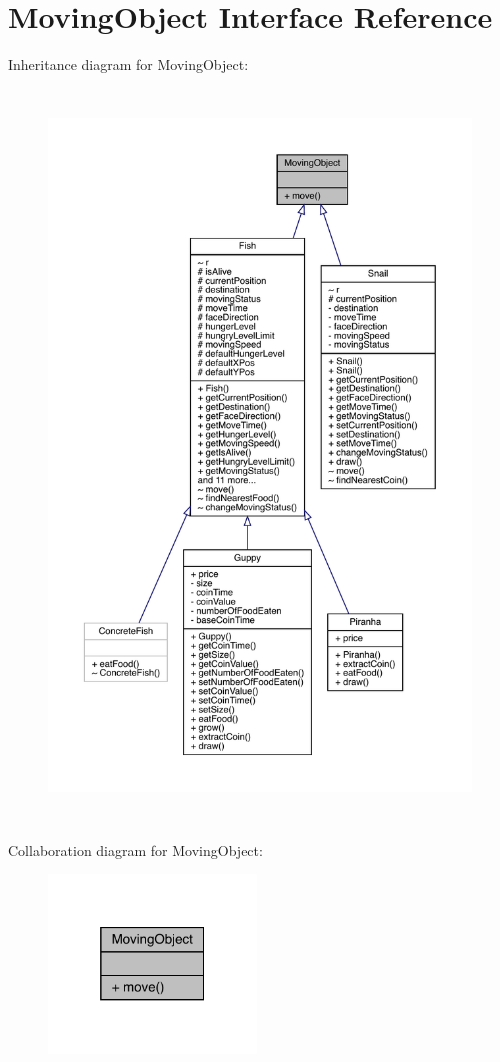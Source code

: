 \hypertarget{interface_moving_object}{}\section{Moving\+Object Interface Reference}
\label{interface_moving_object}


Inheritance diagram for Moving\+Object\+:
\nopagebreak
\begin{figure}[H]
\begin{center}
\leavevmode
\includegraphics[height=550pt]{interface_moving_object__inherit__graph}
\end{center}
\end{figure}


Collaboration diagram for Moving\+Object\+:
\nopagebreak
\begin{figure}[H]
\begin{center}
\leavevmode
\includegraphics[width=157pt]{interface_moving_object__coll__graph}
\end{center}
\end{figure}
